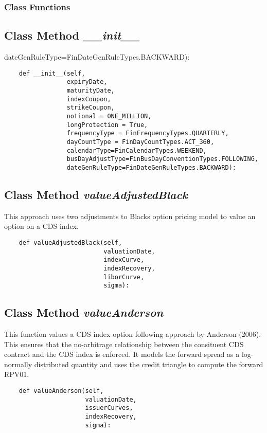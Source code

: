 \documentclass[twoside,11pt]{book}
\begin{document}
\subsubsection{Class Functions}

\subsection{Class Method {\it \_\_init\_\_}}
dateGenRuleType=FinDateGenRuleTypes.BACKWARD):

\begin{lstlisting}
    def __init__(self,
                 expiryDate,
                 maturityDate,
                 indexCoupon,
                 strikeCoupon,
                 notional = ONE_MILLION,
                 longProtection = True,
                 frequencyType = FinFrequencyTypes.QUARTERLY,
                 dayCountType = FinDayCountTypes.ACT_360,
                 calendarType=FinCalendarTypes.WEEKEND,
                 busDayAdjustType=FinBusDayConventionTypes.FOLLOWING,
                 dateGenRuleType=FinDateGenRuleTypes.BACKWARD):
\end{lstlisting}

\subsection{Class Method {\it valueAdjustedBlack}}
This approach uses two adjustments to Blacks option pricing model to value an option on a CDS index. 

\begin{lstlisting}
    def valueAdjustedBlack(self, 
                           valuationDate, 
                           indexCurve, 
                           indexRecovery,
                           liborCurve,
                           sigma):
\end{lstlisting}

\subsection{Class Method {\it valueAnderson}}
This function values a CDS index option following approach by Anderson (2006). This ensures that the no-arbitrage relationship between the consituent CDS contract and the CDS index is enforced. It models the forward spread as a log-normally distributed quantity and uses the credit triangle to compute the forward RPV01. 

\begin{lstlisting}
    def valueAnderson(self,
                      valuationDate,
                      issuerCurves,
                      indexRecovery,
                      sigma):
\end{lstlisting}
\end{document}
